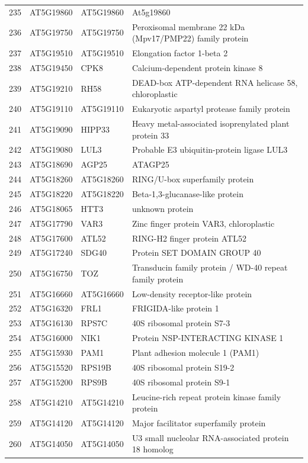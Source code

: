 \documentclass[11pt]{article}
\begin{document}
\begin{center}
\begin{tabular}{rlll}
235 & AT5G19860 & AT5G19860 & At5g19860\\
236 & AT5G19750 & AT5G19750 & Peroxisomal membrane 22 kDa (Mpv17/PMP22) family protein\\
237 & AT5G19510 & AT5G19510 & Elongation factor 1-beta 2\\
238 & AT5G19450 & CPK8 & Calcium-dependent protein kinase 8\\
239 & AT5G19210 & RH58 & DEAD-box ATP-dependent RNA helicase 58, chloroplastic\\
240 & AT5G19110 & AT5G19110 & Eukaryotic aspartyl protease family protein\\
241 & AT5G19090 & HIPP33 & Heavy metal-associated isoprenylated plant protein 33\\
242 & AT5G19080 & LUL3 & Probable E3 ubiquitin-protein ligase LUL3\\
243 & AT5G18690 & AGP25 & ATAGP25\\
244 & AT5G18260 & AT5G18260 & RING/U-box superfamily protein\\
245 & AT5G18220 & AT5G18220 & Beta-1,3-glucanase-like protein\\
246 & AT5G18065 & HTT3 & unknown protein\\
247 & AT5G17790 & VAR3 & Zinc finger protein VAR3, chloroplastic\\
248 & AT5G17600 & ATL52 & RING-H2 finger protein ATL52\\
249 & AT5G17240 & SDG40 & Protein SET DOMAIN GROUP 40\\
250 & AT5G16750 & TOZ & Transducin family protein / WD-40 repeat family protein\\
251 & AT5G16660 & AT5G16660 & Low-density receptor-like protein\\
252 & AT5G16320 & FRL1 & FRIGIDA-like protein 1\\
253 & AT5G16130 & RPS7C & 40S ribosomal protein S7-3\\
254 & AT5G16000 & NIK1 & Protein NSP-INTERACTING KINASE 1\\
255 & AT5G15930 & PAM1 & Plant adhesion molecule 1 (PAM1)\\
256 & AT5G15520 & RPS19B & 40S ribosomal protein S19-2\\
257 & AT5G15200 & RPS9B & 40S ribosomal protein S9-1\\
258 & AT5G14210 & AT5G14210 & Leucine-rich repeat protein kinase family protein\\
259 & AT5G14120 & AT5G14120 & Major facilitator superfamily protein\\
260 & AT5G14050 & AT5G14050 & U3 small nucleolar RNA-associated protein 18 homolog\\

\end{tabular}
\end{center}
\end{document}
